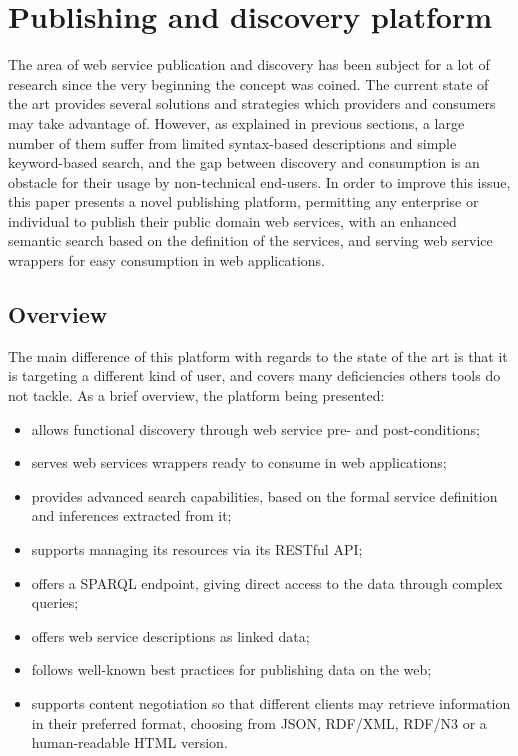 
\section{Publishing and discovery platform}
\label{sec:discovery}

The area of web service publication and discovery has been subject for a lot of research since the very beginning the concept was coined. The current state of the art provides several solutions and strategies which providers and consumers may take advantage of. However, as explained in previous sections, a large number of them suffer from limited syntax-based descriptions and simple keyword-based search, and the gap between discovery and consumption is an obstacle for their usage by non-technical end-users. In order to improve this issue, this paper presents a novel publishing platform, permitting any enterprise or individual to publish their public domain web services, with an enhanced semantic search based on the definition of the services, and serving web service wrappers for easy consumption in web applications.

\subsection{Overview}
\label{ssec:overview}

The main difference of this platform with regards to the state of the art is that it is targeting a different kind of user, and covers many deficiencies others tools do not tackle. As a brief overview, the platform being presented:

\begin{itemize}
  \item allows functional discovery through web service pre- and post-conditions;
	\item serves web services wrappers ready to consume in web applications;
	\item provides advanced search capabilities, based on the formal service definition and inferences extracted from it;
	\item supports managing its resources via its RESTful API;
	\item offers a SPARQL endpoint, giving direct access to the data through complex queries;
	\item offers web service descriptions as linked data;
	\item follows well-known best practices for publishing data on the web;
	\item supports content negotiation so that different clients may retrieve information in their preferred format, choosing from JSON, RDF/XML, RDF/N3 or a human-readable HTML version.
\end{itemize}

